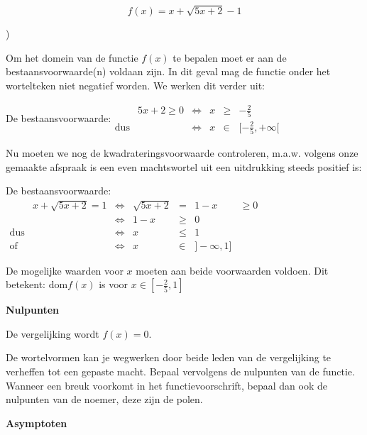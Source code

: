 \begin{voorbeeld}
\begin{equation*}
f(x)=x+\sqrt{5x+2}-1
\end{equation*}


\begin{figure}[h]
		
\end{figure})



Om het domein van de functie $f(x)$ te bepalen moet er aan de bestaansvoorwaarde(n)
voldaan zijn. In dit geval mag de functie onder het wortelteken niet
negatief worden. We werken dit verder uit:

De bestaansvoorwaarde:$\begin{array}{cclccc}
 & 5x+2\geq0
 & \iff & x & \geq & -\frac{2}{5}\\
\textrm{dus} & & \iff & x & \in & [-\frac{2}{5},+\infty[
\end{array}$

Nu moeten we nog de kwadrateringsvoorwaarde controleren, m.a.w. volgens
onze gemaakte afspraak is een even machtswortel uit een uitdrukking
steeds positief is:

De bestaansvoorwaarde:
$\begin{array}{cccclcc}
 & x+\sqrt{5x+2}=1 & \iff & \sqrt{5x+2} & = & 1-x & \geq0\\
 & & \iff & 1-x & \geq & 0\\
\textrm{dus} & & \iff & x & \leq & 1\\
\textrm{of} & & \iff & x & \in & ]-\infty,1]
\end{array}$

De mogelijke waarden voor $x$ moeten aan beide voorwaarden voldoen.
Dit betekent: $\textrm{dom}f(x)$ is voor $x\in[-\frac{2}{5},1]$

\end{voorbeeld}

\textbf{Nulpunten}

De vergelijking wordt $f(x)=0$.

De wortelvormen kan je wegwerken door beide leden van de vergelijking
te verheffen tot een gepaste macht. Bepaal vervolgens de nulpunten
van de functie. Wanneer een breuk voorkomt in het functievoorschrift,
bepaal dan ook de nulpunten van de noemer, deze zijn de polen.

\textbf{Asymptoten}

